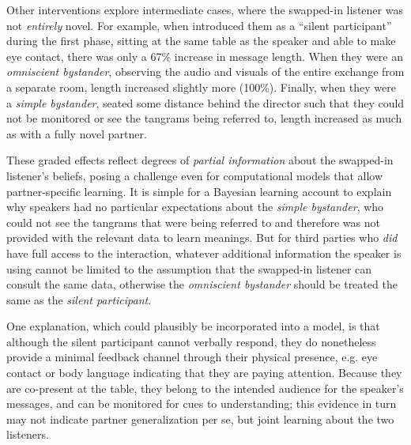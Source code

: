 Other interventions explore intermediate cases, where the swapped-in listener was not \emph{entirely} novel. For example, when  introduced them as a ``silent participant'' during the first phase, sitting at the same table as the speaker and able to make eye contact, there was only a 67\% increase in message length. When they were an \emph{omniscient bystander}, observing the audio and visuals of the entire exchange from a separate room, length increased slightly more (100\%). Finally, when they were a \emph{simple bystander}, seated some distance behind the director such that they could not be monitored or see the tangrams being referred to, length increased as much as with a fully novel partner. 

These graded effects reflect degrees of \emph{partial information} about the swapped-in listener's beliefs, posing a challenge even for computational models that allow partner-specific learning. It is simple for a Bayesian learning account to explain why speakers had no particular expectations about the \emph{simple bystander}, who could not see the tangrams that were being referred to and therefore was not provided with the relevant data to learn meanings. But for third parties who \emph{did} have full access to the interaction, whatever additional information the speaker is using cannot be limited to the assumption that the swapped-in listener can consult the same data, otherwise the \emph{omniscient bystander} should be treated the same as the \emph{silent participant}. 

One explanation, which could plausibly be incorporated into a model, is that although the silent participant cannot verbally respond, they do nonetheless provide a minimal feedback channel through their physical presence, e.g. eye contact or body language indicating that they are paying attention. Because they are co-present at the table, they belong to the intended audience for the speaker's messages, and can be monitored for cues to understanding; this evidence in turn may not indicate partner generalization per se, but joint learning about the two listeners. 

